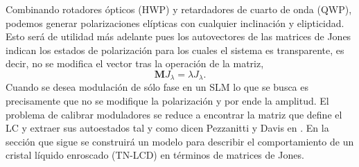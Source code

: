 Combinando rotadores ópticos (HWP) y retardadores de cuarto de onda (QWP),
podemos generar polarizaciones elípticas con cualquier inclinación y
elipticidad. Esto será de utilidad más adelante pues los autovectores
de las matrices de Jones indican los estados de polarización para los
cuales el sistema es transparente, es decir, no se modifica el vector
tras la operación de la matriz,
\[\mathbf{M}J_{\lambda} = \lambda J_{\lambda}.\]
Cuando se desea modulación de sólo fase en un SLM lo que se busca es
precisamente que no se modifique la polarización y por ende la
amplitud. El problema de calibrar moduladores se reduce a encontrar la
matriz que define el LC y extraer sus autoestados tal y como dicen
Pezzanitti y Davis en .
En la sección que sigue se construirá un modelo para describir el
comportamiento de un cristal líquido enroscado (TN-LCD) en términos de
matrices de Jones.

